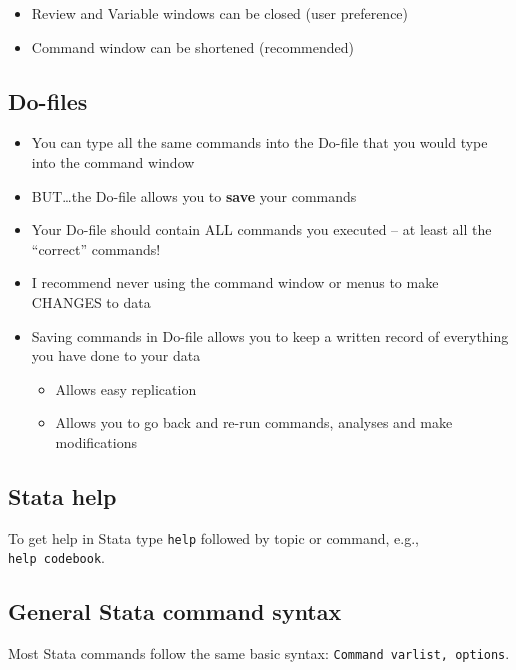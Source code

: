 \documentclass[]{book}
\providecommand{\tightlist}{%
  \setlength{\itemsep}{0pt}\setlength{\parskip}{0pt}}
\begin{document}
\begin{itemize}
\tightlist
\item
  Review and Variable windows can be closed (user preference)
\item
  Command window can be shortened (recommended)
\end{itemize}

\hypertarget{do-files}{%
\subsection{Do-files}\label{do-files}}

\begin{itemize}
\tightlist
\item
  You can type all the same commands into the Do-file that you would type into the command window
\item
  BUT\ldots the Do-file allows you to \textbf{save} your commands
\item
  Your Do-file should contain ALL commands you executed -- at least all the ``correct'' commands!
\item
  I recommend never using the command window or menus to make CHANGES to data
\item
  Saving commands in Do-file allows you to keep a written record of everything you have done to your data

  \begin{itemize}
  \tightlist
  \item
    Allows easy replication
  \item
    Allows you to go back and re-run commands, analyses and make modifications
  \end{itemize}
\end{itemize}

\hypertarget{stata-help}{%
\subsection{Stata help}\label{stata-help}}

To get help in Stata type \texttt{help} followed by topic or command, e.g., \texttt{help\ codebook}.

\hypertarget{general-stata-command-syntax}{%
\subsection{General Stata command syntax}\label{general-stata-command-syntax}}

Most Stata commands follow the same basic syntax: \texttt{Command\ varlist,\ options}.
\end{document}

